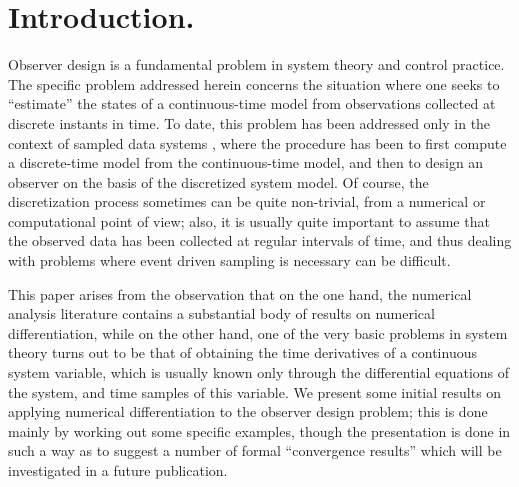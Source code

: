 \section{Introduction.}  Observer design is a fundamental problem in system theory and 
control practice.  
The specific problem addressed herein concerns the situation where
one seeks to ``estimate'' the states of a continuous-time model from
observations collected at discrete instants in time.  To date, this problem has
been addressed only in the context of sampled data systems
\cite{grizzle1990b,moraal1992}, where the
procedure has been to first compute
a discrete-time model from the continuous-time model, and
then to design an observer on the basis of the discretized system model.
Of course, the discretization process sometimes can be quite non-trivial, from
a numerical or computational point of view; also, it is usually quite important 
to assume that the observed data has been collected at regular intervals of time,
and thus dealing with problems where event driven sampling is necessary can be difficult.  

This paper arises from the observation that
on the one hand, the numerical analysis literature contains a
substantial body of results on numerical differentiation, while on
the other hand, one of the very basic problems in system theory turns
out to be that of obtaining the time derivatives of a continuous system
variable, which is usually known only through the differential equations of
the system, and time samples of this variable.
We present some initial results on applying numerical differentiation
to the observer design problem; this is done mainly by
working out some specific examples, though the presentation is done
in such a way as to suggest a number of formal ``convergence results'' which will be
investigated in a future publication.

